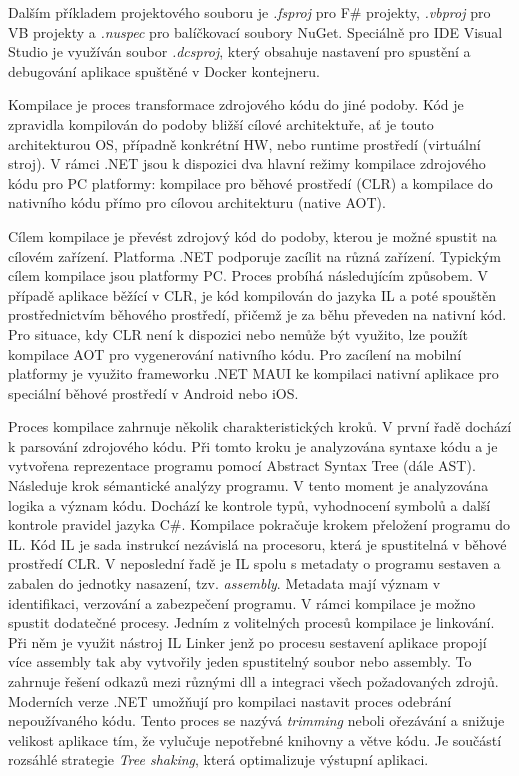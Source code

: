 Dalším příkladem projektového souboru je \emph{.fsproj} pro F\# projekty, \emph{.vbproj} pro VB projekty a \emph{.nuspec} pro balíčkovací soubory NuGet. Speciálně pro IDE Visual Studio je využíván soubor \emph{.dcsproj}, který obsahuje nastavení pro spustění a debugování aplikace spuštěné v Docker kontejneru. 


Kompilace je proces transformace zdrojového kódu do jiné podoby. Kód je zpravidla kompilován do podoby bližší cílové architektuře, ať je touto architekturou OS, případně konkrétní HW, nebo runtime prostředí (virtuální stroj). \cite{Richter2012} V rámci .NET jsou k dispozici dva hlavní režimy kompilace zdrojového kódu pro PC platformy: kompilace pro běhové prostředí (CLR) a kompilace do nativního kódu přímo pro cílovou architekturu (native AOT).

Cílem kompilace je převést zdrojový kód do podoby, kterou je možné spustit na cílovém zařízení. Platforma .NET podporuje zacílit na různá zařízení. Typickým cílem kompilace jsou platformy PC. Proces probíhá následujícím způsobem. V případě aplikace běžící v CLR, je kód kompilován do jazyka IL a poté spouštěn prostřednictvím běhového prostředí, přičemž je za běhu převeden na nativní kód. \cite{Richter2012} Pro situace, kdy CLR není k dispozici nebo nemůže být využito, lze použít kompilace AOT pro vygenerování nativního kódu. \cite{Pflug2023} Pro zacílení na mobilní platformy je využito frameworku .NET MAUI ke kompilaci nativní aplikace pro speciální běhové prostředí v Android nebo iOS. \cite{Libery2023}


Proces kompilace zahrnuje několik charakteristických kroků. V první řadě dochází k parsování zdrojového kódu. Při tomto kroku je analyzována syntaxe kódu a je vytvořena reprezentace programu pomocí Abstract Syntax Tree (dále AST). Následuje krok sémantické analýzy programu. V tento moment je analyzována logika a význam kódu. Dochází ke kontrole typů, vyhodnocení symbolů a další kontrole pravidel jazyka C\#. Kompilace pokračuje krokem přeložení programu do IL. Kód IL je sada instrukcí nezávislá na procesoru, která je spustitelná v běhové prostředí CLR. \cite{Richter2012} V neposlední řadě je IL spolu s metadaty o programu sestaven a zabalen do jednotky nasazení, tzv. \emph{assembly}.  Metadata mají význam v identifikaci, verzování a zabezpečení programu. V rámci kompilace je možno spustit dodatečné procesy. Jedním z volitelných procesů kompilace je linkování. Při něm je využit nástroj IL Linker jenž po procesu sestavení aplikace propojí více assembly tak aby vytvořily jeden spustitelný soubor nebo assembly. \cite{Bock2016} To zahrnuje řešení odkazů mezi různými dll a integraci všech požadovaných zdrojů. Moderních verze .NET umožňují pro kompilaci nastavit proces odebrání nepoužívaného kódu. Tento proces se nazývá \emph{trimming} neboli ořezávání a snižuje velikost aplikace tím, že vylučuje nepotřebné knihovny a větve kódu. \cite{Price2023c8} Je součástí rozsáhlé strategie \emph{Tree shaking}, která optimalizuje výstupní aplikaci.

